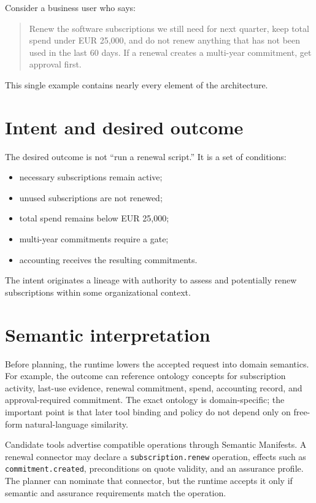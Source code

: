 \documentclass[10pt,oneside,openany]{book}
\newcommand{\mono}[1]{\texttt{#1}}
\begin{document}
Consider a business user who says:

\begin{quote}
Renew the software subscriptions we still need for next quarter, keep total spend under EUR 25,000, and do not renew anything that has not been used in the last 60 days. If a renewal creates a multi-year commitment, get approval first.
\end{quote}

This single example contains nearly every element of the architecture.

\section{Intent and desired outcome}
The desired outcome is not ``run a renewal script.'' It is a set of conditions:

\begin{itemize}
\item necessary subscriptions remain active;
\item unused subscriptions are not renewed;
\item total spend remains below EUR 25,000;
\item multi-year commitments require a gate;
\item accounting receives the resulting commitments.
\end{itemize}

The intent originates a lineage with authority to assess and potentially renew subscriptions within some organizational context.

\section{Semantic interpretation}
Before planning, the runtime lowers the accepted request into domain semantics. For example, the outcome can reference ontology concepts for subscription activity, last-use evidence, renewal commitment, spend, accounting record, and approval-required commitment. The exact ontology is domain-specific; the important point is that later tool binding and policy do not depend only on free-form natural-language similarity.

Candidate tools advertise compatible operations through Semantic Manifests. A renewal connector may declare a \mono{subscription.renew} operation, effects such as \mono{commitment.created}, preconditions on quote validity, and an assurance profile. The planner can nominate that connector, but the runtime accepts it only if semantic and assurance requirements match the operation.
\end{document}

